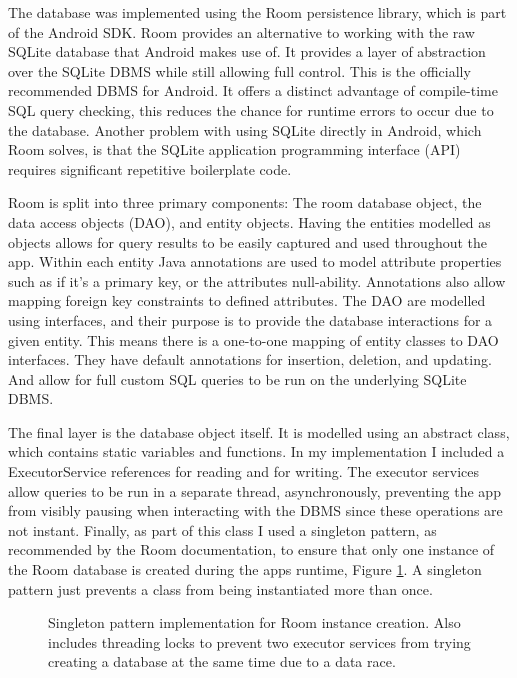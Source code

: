 \documentclass{l4proj}
\begin{document}
The database was implemented using the Room persistence library, which is part of the Android SDK. Room provides an alternative to working with the raw SQLite database that Android makes use of. It provides a layer of abstraction over the SQLite DBMS while still allowing full control. This is the officially recommended DBMS for Android. It offers a distinct advantage of compile-time SQL query checking, this reduces the chance for runtime errors to occur due to the database. Another problem with using SQLite directly in Android, which Room solves, is that the SQLite application programming interface (API) requires significant repetitive boilerplate code.

Room is split into three primary components: The room database object, the data access objects (DAO), and entity objects. Having the entities modelled as objects allows for query results to be easily captured and used throughout the app. Within each entity Java annotations are used to model attribute properties such as if it's a primary key, or the attributes null-ability. Annotations also allow mapping foreign key constraints to defined attributes. The DAO are modelled using interfaces, and their purpose is to provide the database interactions for a given entity. This means there is a one-to-one mapping of entity classes to DAO interfaces. They have default annotations for insertion, deletion, and updating. And allow for full custom SQL queries to be run on the underlying SQLite DBMS.

The final layer is the database object itself. It is modelled using an abstract class, which contains static variables and functions. In my implementation I included a ExecutorService references for reading and for writing. The executor services allow queries to be run in a separate thread, asynchronously, preventing the app from visibly pausing when interacting with the DBMS since these operations are not instant. Finally, as part of this class I used a singleton pattern, as recommended by the Room documentation, to ensure that only one instance of the Room database is created during the apps runtime, Figure \ref{cde:singleton}. A singleton pattern just prevents a class from being instantiated more than once.

\begin{figure}[!htb]
    
    \caption{ Singleton pattern implementation for Room instance creation. Also includes threading locks to prevent two executor services from trying creating a database at the same time due to a data race. }
    \label{cde:singleton}
\end{figure}
\end{document}
